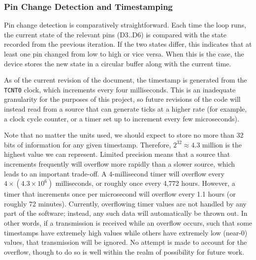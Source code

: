 \documentclass[12pt]{article}
\begin{document}
%
%
%

\subsubsection{Pin Change Detection and Timestamping}

Pin change detection is comparatively straightforward.
Each time the loop runs, the current state of the relevant pins (D3..D6) is
compared with the state recorded from the previous iteration.
If the two states differ, this indicates that at least one pin changed from
low to high or vice versa.
When this is the case, the device stores the new state in a circular
buffer along with the current time.

As of the current revision of the document, the timestamp is generated from
the \texttt{TCNT0} clock, which increments every four milliseconds.
This is an inadequate granularity for the purposes of this project, so future
revisions of the code will instead read from a source that can generate ticks
at a higher rate (for example, a clock cycle counter, or a timer set up to
increment every few microseconds).

Note that no matter the units used, we should expect to store no more than 32
bits of information for any given timestamp.
Therefore, $2^{32} \approx 4.3$ million is the highest value we can represent.
Limited precision means that a source that increments frequently will overflow
more rapidly than a slower source, which leads to an important trade-off.
A 4-millisecond timer will overflow every $4\times (4.3\times 10^6)$
milliseconds, or roughly once every 4,772 hours.
However, a timer that increments once per microsecond will overflow every 1.1
hours (or roughly 72 minutes).
Currently, overflowing timer values are not handled by any part of the
software; instead, any such data will automatically be thrown out.
In other words, if a transmission is received while an overflow occurs, such
that some timestamps have extremely high values while others have extremely
low (near-0) values, that transmission will be ignored.
No attempt is made to account for the overflow, though to do so is well within
the realm of possibility for future work.
\end{document}
